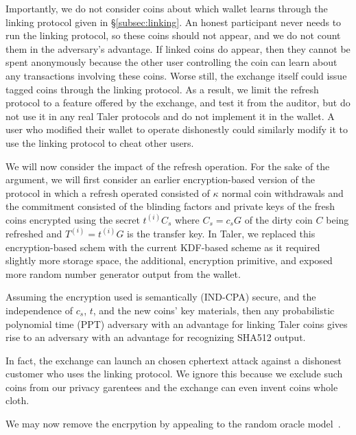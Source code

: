 \documentclass[sigconf, authordraft]{acmart}
\begin{document}
Importantly, we do not consider coins about which wallet learns
through the linking protocol given in \S\ref{subsec:linking}.
An honest participant never needs to run the linking protocol,
so these coins should not appear, and we do not count them in
the adversary's advantage.    If linked coins do appear, then
they cannot be spent anonymously because the other user controlling
the coin can learn about any transactions involving these coins.
Worse still, the exchange itself could issue tagged coins through
the linking protocol.  As a result, we limit the refresh protocol to
a feature offered by the exchange, and test it from the auditor, but
do not use it in any real Taler protocols and do not implement it in
the wallet.  A user who modified their wallet to operate dishonestly
could similarly modify it to use the linking protocol to cheat
other users.

\smallskip

We will now consider the impact of the refresh operation.
For the sake of the argument, we will first consider an earlier
encryption-based version of the protocol in which a refresh operated
consisted of $\kappa$ normal coin withdrawals and the commitment
consisted of the blinding factors and private keys of the fresh coins
encrypted using the secret $t^{(i)} C_s$ where $C_s = c_s G$ of the
dirty coin $C$ being refreshed and $T^{(i)} = t^{(i)} G$ is the
transfer key.
%
In Taler, we replaced this encryption-based schem with the current
KDF-based scheme as it required slightly more storage space, the
additional, encryption primitive, and exposed more random number
generator output from the wallet.

\begin{proposition}
Assuming the encryption used is semantically (IND-CPA) secure, and
 the independence of $c_s$, $t$, and the new coins' key materials,
then any probabilistic polynomial time (PPT) adversary with an
advantage for linking Taler coins gives rise to an adversary with
 an advantage for recognizing SHA512 output.
\end{proposition}

In fact, the exchange can launch an chosen cphertext attack against
a dishonest customer who uses the linking protocol.  We ignore this
because we exclude such coins from our privacy garentees and the
exchange can even invent coins whole cloth.

We may now remove the encrpytion by appealing to the random oracle
model~\cite{BR-RandomOracles}.
\end{document}

